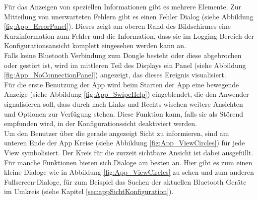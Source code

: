 Für das Anzeigen von speziellen Informationen gibt es mehrere Elemente. Zur Mitteilung von unerwarteten Fehlern gibt es einen Fehler Dialog (siehe Abbildung \ref{fig:App_ErrorPanel}). Dieses zeigt am oberen Rand des Bildschirmes eine Kurzinformation zum Fehler und die Information, dass sie im Logging-Bereich der Konfigurationsansicht komplett eingesehen werden kann an.
\\
Falls keine Bluetooth Verbindung zum Dongle besteht oder diese abgebrochen oder gestört ist, wird im mittleren Teil des Displays ein Panel (siehe Abbildung \ref{fig:App_NoConnectionPanel}) angezeigt, das dieses Ereignis visualisiert.
\\
Für die erste Benutzung der App wird beim Starten der App eine bewegende Anzeige (siehe Abbildung \ref{fig:App_SwipeHelp}) eingeblendet, die den Anwender signalisieren soll, dass durch nach Links und Rechts wischen weitere Ansichten und Optionen zur Verfügung stehen. Diese Funktion kann, falls sie als Störend empfunden wird, in der Konfigurationssicht deaktiviert werden. 
\\
Um den Benutzer über die gerade angezeigt Sicht zu informieren, sind am unteren Ende der App Kreise (siehe Abbildung \ref{fig:App_ViewCircles}) für jede View symbolisiert. Der Kreis für die zurzeit sichtbare Ansicht ist dabei ausgefüllt.
\\
Für manche Funktionen bieten sich Dialoge am besten an. Hier gibt es zum einen kleine Dialoge wie in Abbildung \ref{fig:App_ViewCircles} zu sehen und zum anderen Fullscreen-Dialoge, für zum Beispiel das Suchen der aktuellen Bluetooth Geräte im Umkreis (siehe Kapitel \ref{sec:appSichtKonfiguration}).


 
 
 
 